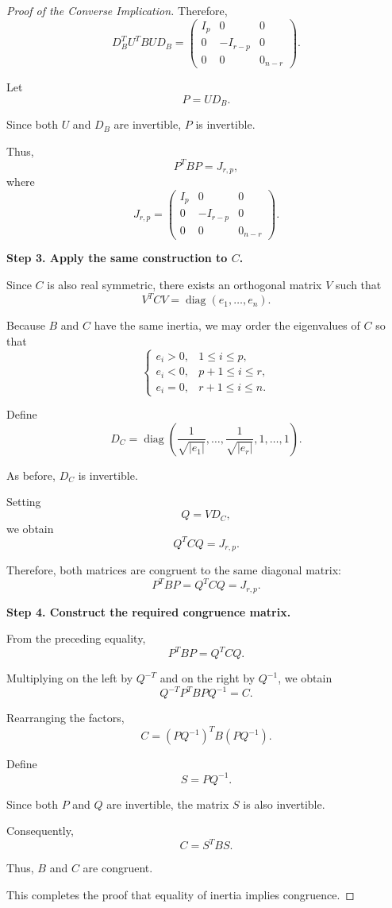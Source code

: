 \documentclass[11pt]{article}
\theoremstyle{definition}
\theoremstyle{remark}
\begin{document}
\begin{proof}[Proof of the Converse Implication]
Therefore,
\[
    D_B^TU^TBUD_B
    =
    \begin{pmatrix}
        I_p&0&0\\
        0&-I_{r-p}&0\\
        0&0&0_{n-r}
    \end{pmatrix}.
\]

Let
\[
    P=UD_B.
\]

Since both $U$ and $D_B$ are
invertible, $P$ is invertible.

Thus,
\[
    \boxed{
    P^TBP=J_{r,p},
    }
\]
where
\[
    \boxed{
    J_{r,p}=
    \begin{pmatrix}
        I_p&0&0\\
        0&-I_{r-p}&0\\
        0&0&0_{n-r}
    \end{pmatrix}.
    }
\]

\medskip

\textbf{Step 3. Apply the same construction to $C$.}

Since $C$ is also real symmetric,
there exists an orthogonal matrix $V$
such that
\[
    V^TCV
    =\operatorname{diag}(e_1,\ldots,e_n).
\]

Because $B$ and $C$ have the same
inertia, we may order the eigenvalues
of $C$ so that
\[
\begin{cases}
    e_i>0, &1\leq i\leq p,\\
    e_i<0, &p+1\leq i\leq r,\\
    e_i=0, &r+1\leq i\leq n.
\end{cases}
\]

Define
\[
    D_C=
    \operatorname{diag}
    \left(
    \frac{1}{\sqrt{|e_1|}},
    \ldots,
    \frac{1}{\sqrt{|e_r|}},
    1,\ldots,1
    \right).
\]

As before, $D_C$ is invertible.

Setting
\[
    Q=VD_C,
\]
we obtain
\[
    \boxed{
    Q^TCQ=J_{r,p}.
    }
\]

Therefore, both matrices are congruent
to the same diagonal matrix:
\[
    \boxed{
    P^TBP=Q^TCQ=J_{r,p}.
    }
\]

\medskip

\textbf{Step 4. Construct the required congruence matrix.}

From the preceding equality,
\[
    P^TBP=Q^TCQ.
\]

Multiplying on the left by $Q^{-T}$
and on the right by $Q^{-1}$, we obtain
\[
    Q^{-T}P^TBPQ^{-1}=C.
\]

Rearranging the factors,
\[
    C=(PQ^{-1})^TB(PQ^{-1}).
\]

Define
\[
    \boxed{S=PQ^{-1}}.
\]

Since both $P$ and $Q$ are invertible,
the matrix $S$ is also invertible.

Consequently,
\[
    \boxed{C=S^TBS}.
\]

Thus, $B$ and $C$ are congruent.

This completes the proof that equality
of inertia implies congruence.

\end{proof}
\end{document}
